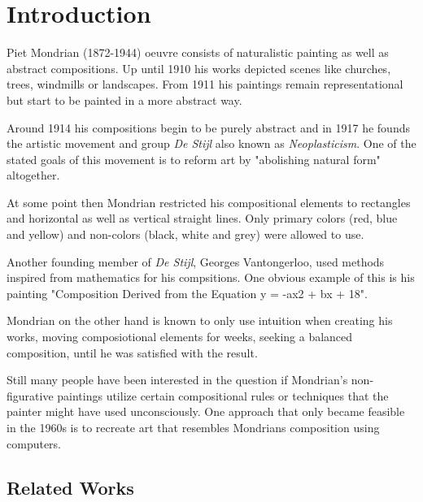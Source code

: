 \section{Introduction}

Piet Mondrian (1872-1944) oeuvre consists of naturalistic painting as well
as abstract compositions. Up until 1910 his works depicted scenes like
churches, trees, windmills or landscapes. From 1911 his paintings
remain representational but start to be painted in a more abstract way.

Around 1914 his compositions begin to be purely abstract and in 1917 he founds
the artistic movement and group \textit{De Stijl} also known as
\textit{Neoplasticism}. One of the stated goals of this movement is to reform
art by "abolishing natural form" \cite{wiki:manifest} altogether.


At some point then Mondrian restricted his compositional elements to rectangles
and horizontal as well as vertical straight lines. Only primary colors (red,
blue and yellow) and non-colors (black, white and grey) were allowed to use.

Another founding member of \textit{De Stijl}, Georges Vantongerloo, used methods
inspired from mathematics for his compsitions. One obvious example of this is
his painting "Composition Derived from the Equation y = -ax2 + bx + 18".

Mondrian on the other hand is known to only use intuition when creating his
works, moving composiotional elements for weeks, seeking a balanced composition,
until he was satisfied with the result.

Still many people have been interested in the question if Mondrian's
non-figurative paintings utilize certain compositional rules or techniques that
the painter might have used unconsciously. One approach that only became
feasible in the 1960s is to recreate art that resembles Mondrians composition
using computers.

\subsection{Related Works}


